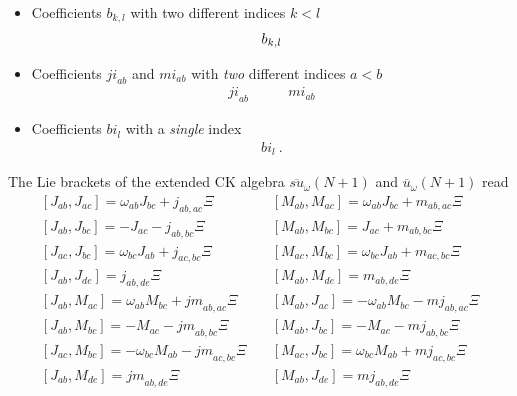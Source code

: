 \documentclass[12pt]{article}
\begin{document}
\begin{itemize}
\begin{equation}
\end{equation}
\item Coefficients ${b}_{k,l}$ with two different indices $k<l$
\begin{equation}
\begin{array}{l}
 {b}_{k,l} \cr
\end{array}
\label{ECf}
\end{equation}
\item Coefficients ${ji}_{ab}$ and ${mi}_{ab}$ with \emph{two}
different indices $a<b$
\begin{equation}
\begin{array}{ll}
 {ji}_{ab}  &\qquad {mi}_{ab}
\end{array}
\label{ECg}
\end{equation}
\item Coefficients ${bi}_{l}$ with a \emph{single} index
\begin{equation}
\begin{array}{ll}
 {bi}_{l}\ .
\end{array}
\label{ECh}
\end{equation}
\end{itemize}
The Lie brackets of the extended CK algebra
$\overline{su}_{\omega}(N+1)$  and
$\overline{u}_{\omega}(N+1)$   read
\begin{equation}
\begin{array}{ll}
[{J}_{ab},{J}_{ac}] ={\omega}_{ab}{J}_{bc}+{j}_{ab,ac}\Xi &\quad
[{M}_{ab},{M}_{ac}] ={\omega}_{ab}{J}_{bc}+{m}_{ab,ac}\Xi
\\{}
[{J}_{ab},{J}_{bc}] =-{J}_{ac} -{j}_{ab,bc}\Xi &\quad
[{M}_{ab},{M}_{bc}] ={J}_{ac}+{m}_{ab,bc}\Xi
\\{}
[{J}_{ac},{J}_{bc}] ={\omega}_{bc}{J}_{ab} + {j}_{ac,bc}\Xi  &\quad
[{M}_{ac},{M}_{bc}] ={\omega}_{bc}{J}_{ab} + {m}_{ac,bc}\Xi
\\{}
[{J}_{ab},{J}_{de}]= {j}_{ab,de}\Xi &\quad
[{M}_{ab},{M}_{de}] ={m}_{ab,de}\Xi
\\[0.3cm]
[{J}_{ab},{M}_{ac}] ={\omega}_{ab}{M}_{bc}+{jm}_{ab,ac} \Xi &\quad
[{M}_{ab},{J}_{ac}] =-{\omega}_{ab}{M}_{bc} - {mj}_{ab,ac}\Xi
\\{}
[{J}_{ab},{M}_{bc}] =-{M}_{ac}- {jm}_{ab,bc} \Xi &\quad
[{M}_{ab},{J}_{bc}] =-{M}_{ac} - {mj}_{ab,bc} \Xi
\\{}
[{J}_{ac},{M}_{bc}] =-{\omega}_{bc}{M}_{ab} - {jm}_{ac,bc}\Xi &\quad
[{M}_{ac},{J}_{bc}] ={\omega}_{bc}{M}_{ab} + {mj}_{ac,bc} \Xi
\\{}
[{J}_{ab},{M}_{de}] ={jm}_{ab,de}\Xi &\quad
[{M}_{ab},{J}_{de}] ={mj}_{ab,de}\Xi
\end{array}
\label{CKsuExtA}
\end{equation}
\end{document}

